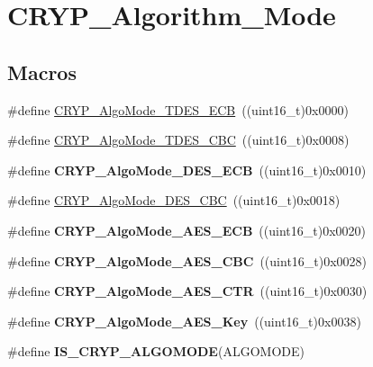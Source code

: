 \hypertarget{group___c_r_y_p___algorithm___mode}{\section{C\-R\-Y\-P\-\_\-\-Algorithm\-\_\-\-Mode}
\label{group___c_r_y_p___algorithm___mode}
}
\subsection*{Macros}
\begin{DoxyCompactItemize}
\item 
\#define \hyperlink{group___c_r_y_p___algorithm___mode_gac032fa07d83dc55d7babd4971d96d3cd}{C\-R\-Y\-P\-\_\-\-Algo\-Mode\-\_\-\-T\-D\-E\-S\-\_\-\-E\-C\-B}~((uint16\-\_\-t)0x0000)
\item 
\#define \hyperlink{group___c_r_y_p___algorithm___mode_ga75c9e649ad171d1ee97b60b237946fc3}{C\-R\-Y\-P\-\_\-\-Algo\-Mode\-\_\-\-T\-D\-E\-S\-\_\-\-C\-B\-C}~((uint16\-\_\-t)0x0008)
\item 
\hypertarget{group___c_r_y_p___algorithm___mode_gad7d3f6cbe5bdc4429fb6d793934a1f67}{\#define {\bfseries C\-R\-Y\-P\-\_\-\-Algo\-Mode\-\_\-\-D\-E\-S\-\_\-\-E\-C\-B}~((uint16\-\_\-t)0x0010)}\label{group___c_r_y_p___algorithm___mode_gad7d3f6cbe5bdc4429fb6d793934a1f67}

\item 
\#define \hyperlink{group___c_r_y_p___algorithm___mode_ga54e4fe95b772fc6ab6015761d746ef9f}{C\-R\-Y\-P\-\_\-\-Algo\-Mode\-\_\-\-D\-E\-S\-\_\-\-C\-B\-C}~((uint16\-\_\-t)0x0018)
\item 
\hypertarget{group___c_r_y_p___algorithm___mode_ga848f43e8f8c3dc5c6703e7bb5564d371}{\#define {\bfseries C\-R\-Y\-P\-\_\-\-Algo\-Mode\-\_\-\-A\-E\-S\-\_\-\-E\-C\-B}~((uint16\-\_\-t)0x0020)}\label{group___c_r_y_p___algorithm___mode_ga848f43e8f8c3dc5c6703e7bb5564d371}

\item 
\hypertarget{group___c_r_y_p___algorithm___mode_ga323e924328e277dc86d4d12711671f89}{\#define {\bfseries C\-R\-Y\-P\-\_\-\-Algo\-Mode\-\_\-\-A\-E\-S\-\_\-\-C\-B\-C}~((uint16\-\_\-t)0x0028)}\label{group___c_r_y_p___algorithm___mode_ga323e924328e277dc86d4d12711671f89}

\item 
\hypertarget{group___c_r_y_p___algorithm___mode_gaff5449a5005dca43408b5ecc7c7a44ac}{\#define {\bfseries C\-R\-Y\-P\-\_\-\-Algo\-Mode\-\_\-\-A\-E\-S\-\_\-\-C\-T\-R}~((uint16\-\_\-t)0x0030)}\label{group___c_r_y_p___algorithm___mode_gaff5449a5005dca43408b5ecc7c7a44ac}

\item 
\hypertarget{group___c_r_y_p___algorithm___mode_gaa96d12461096fba7b3e7a25f036e0cf4}{\#define {\bfseries C\-R\-Y\-P\-\_\-\-Algo\-Mode\-\_\-\-A\-E\-S\-\_\-\-Key}~((uint16\-\_\-t)0x0038)}\label{group___c_r_y_p___algorithm___mode_gaa96d12461096fba7b3e7a25f036e0cf4}

\item 
\#define {\bfseries I\-S\-\_\-\-C\-R\-Y\-P\-\_\-\-A\-L\-G\-O\-M\-O\-D\-E}(A\-L\-G\-O\-M\-O\-D\-E)
\end{DoxyCompactItemize}


